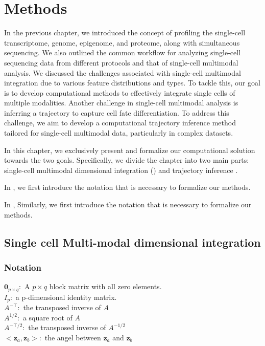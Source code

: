 %
\chapter{Methods}
\label{chapter:methods}
\graphicspath{{chapter3/figs}}

In the previous chapter, we introduced the concept of profiling the single-cell transcriptome, genome, epigenome, and proteome, along with simultaneous sequencing. We also outlined the common workflow for analyzing single-cell sequencing data from different protocols and that of single-cell multimodal analysis. We discussed the challenges associated with single-cell multimodal integration due to various feature distributions and types. To tackle this, our goal is to develop computational methods to effectively integrate single cells of multiple modalities. Another challenge in single-cell multimodal analysis is inferring a trajectory to capture cell fate differentiation. To address this challenge, we aim to develop a computational trajectory inference method tailored for single-cell multimodal data, particularly in complex datasets.

In this chapter, we exclusively present and formalize our computational solution towards the two goals. Specifically, we divide the chapter into two main parts: single-cell multimodal dimensional integration () and trajectory inference .

In , we first introduce the notation that is necessary to formalize our methods.

In , Similarly, we first introduce the notation that is necessary to formalize our methods.


\section{Single cell Multi-modal dimensional integration}
\label{methods:integration}
\subsection{Notation}
$\mathbf{0}_{p\times q}: $ A $p\times q$ block matrix with all zero elements.\\
$I_p:$ a p-dimensional identity matrix.\\
$A^{-\top}:$ the transposed inverse of $A$\\
$A^{1/2}:$ a square root of $A$\\
$A^{-\top/2}:$ the transposed inverse of $A^{-1/2}$\\
$<\mathbf{z}_a, \mathbf{z}_b>:$ the angel between $\mathbf{z}_a$ and $\mathbf{z}_b$

